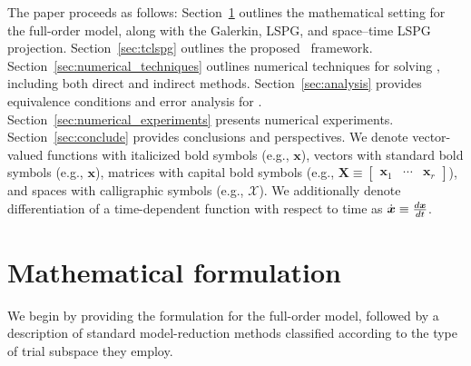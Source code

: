 \documentclass[3p,computermodern,10pt]{elsarticle}
\begin{document}
The paper proceeds as follows: Section~\ref{sec:math}
outlines the mathematical setting for the full-order model, along with the Galerkin, LSPG, and
space--time LSPG projection. Section~\ref{sec:tclspg} outlines the proposed \methodAcronym\
framework. Section~\ref{sec:numerical_techniques}
outlines numerical techniques for solving \methodAcronymROMs, including both direct and
indirect methods. Section~\ref{sec:analysis} provides
equivalence conditions and error analysis for \methodAcronymROMs.
Section~\ref{sec:numerical_experiments} presents numerical experiments.
Section~\ref{sec:conclude} provides conclusions and perspectives.
We denote vector-valued functions with italicized bold symbols (e.g., $\boldsymbol
x$), vectors with standard bold symbols (e.g., $\mathbf{x}$), 
matrices with capital bold symbols (e.g., $\mathbf{X} \equiv \begin{bmatrix}
\mathbf{x}_1 & \cdots & \mathbf{x}_r\end{bmatrix}$), and spaces with
calligraphic symbols (e.g., $\mathcal{X}$). We additionally denote differentiation of a time-dependent 
function with respect to time as $\dot{\boldsymbol x} \equiv \frac{d \boldsymbol x}{dt}$.
\section{Mathematical formulation}\label{sec:math}
	We begin by providing the formulation for the full-order model,
	followed by a description of standard model-reduction methods
	classified according to the type of trial subspace they employ.
\end{document}

